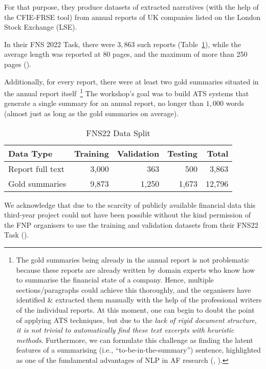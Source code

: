 For that purpose, they produce datasets of extracted narratives (with the help of the CFIE-FRSE tool) from annual reports of UK companies listed on the London Stock Exchange (LSE).

In their FNS 2022 Task, there were $3,863$ such reports (Table~\ref{tab:fns22-data}), while the average length was reported at 80 pages, and the maximum of more than 250 pages (\cite{litvak-vanetik-2021-summarization}).

Additionally, for every report, there were at least two gold summaries situated in the annual report itself~\footnote{
    The gold summaries being already in the annual report is not problematic because these reports are already written by domain experts who know how to summarise the financial state of a company.
    Hence, multiple sections/paragraphs could achieve this thoroughly, and the organisers have identified \& extracted them manually with the help of the professional writers of the individual reports.
    At this moment, one can begin to doubt the point of applying ATS techniques, but due to the \emph{lack of rigid document structure}, \emph{it is not trivial to automatically find these text excerpts with heuristic methods}.
    Furthermore, we can formulate this challenge as finding the latent features of a summarising (i.e., \enquote{to-be-in-the-summary}) sentence, highlighted as one of the fundamental advantages of NLP in AF research (\cite{lewis_young_2019}, \cite{el-haj2019meaning}).
}
The workshop's goal was to build ATS systems that generate a single summary for an annual report, no longer than $1,000$ words (almost just as long as the gold summaries on average).

\begin{table}[h]
    \centering
    \begin{tabular}{lrrr r}
        \hline
        Data Type & Training & Validation & Testing & Total \\
        \midrule
        Report full text & 3,000 & 363 & 500 & 3,863 \\
        Gold summaries & 9,873 & 1,250 & 1,673 & 12,796 \\
        \bottomrule
    \end{tabular}
    \caption{FNS22 Data Split}
    \label{tab:fns22-data}
\end{table}

We acknowledge that due to the scarcity of publicly available financial data this third-year project could not have been possible without the kind permission of the FNP organisers to use the training and validation datasets from their FNS22 Task (\cite{fnp-2022-financial}).

